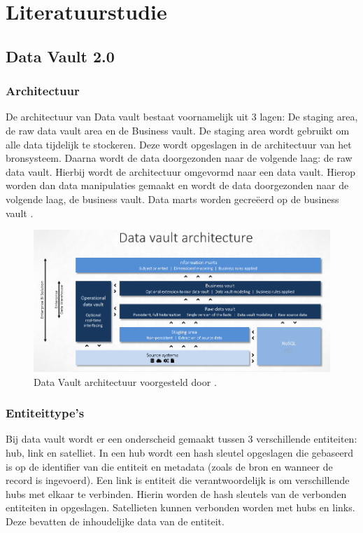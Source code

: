\section{Literatuurstudie}
\label{sec:state-of-the-art}
\subsection{Data Vault 2.0}
\subsubsection{Architectuur}
De architectuur van Data vault bestaat voornamelijk uit 3 lagen: De staging area, de raw data vault area en de Business vault. De staging area wordt gebruikt om alle data tijdelijk te stockeren. Deze wordt opgeslagen in de architectuur van het bronsysteem. Daarna wordt de data doorgezonden naar de volgende laag: de raw data vault. Hierbij wordt de architectuur omgevormd naar een data vault. Hierop worden dan data manipulaties gemaakt en wordt de data doorgezonden naar de volgende laag, de business vault. Data marts worden gecreëerd op de business vault \autocite{Linstedt2015}.

\begin{figure}[h]
	\centering
	\includegraphics[scale=0.345]{images/DVArchitectuur.png}
	\caption{Data Vault architectuur voorgesteld door \textcite{Stroobants2018}.}
	\label{fig:dvarch}
\end{figure}

\subsubsection{Entiteittype's}
Bij data vault wordt er een onderscheid gemaakt tussen 3 verschillende entiteiten: hub, link en satelliet. In een hub wordt een hash sleutel opgeslagen die gebaseerd is op de identifier van die entiteit en metadata (zoals de bron en wanneer de record is ingevoerd). Een link is entiteit die verantwoordelijk is om verschillende hubs met elkaar te verbinden. Hierin worden de hash sleutels van de verbonden entiteiten in opgeslagen. Satellieten kunnen verbonden worden met hubs en links. Deze bevatten de inhoudelijke data van de entiteit.  

